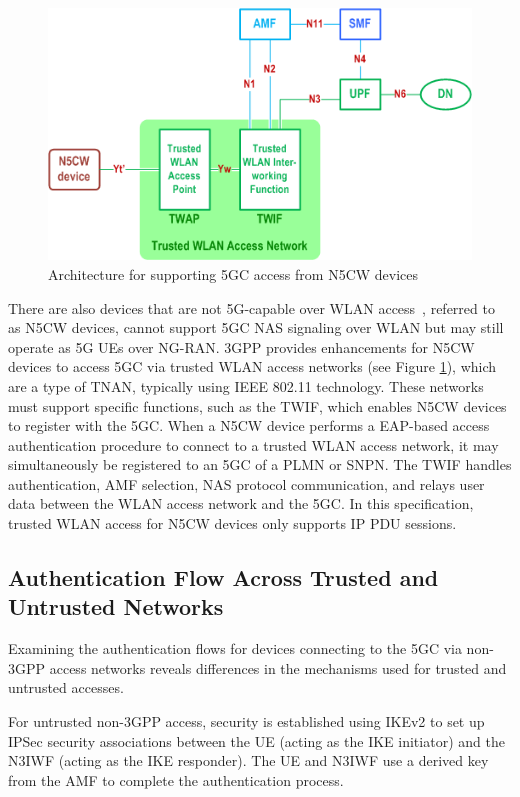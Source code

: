 \begin{figure}
    \centering
    \includegraphics[width=0.5\linewidth]{figs/Architecture for supporting 5GC access from N5CW devices.png}
    \caption{Architecture for supporting \ac{5GC} access from \ac{N5CW} devices}
    \label{fig:Architecture for supporting 5GC access from N5CW devices}
\end{figure}

There are also devices that are not \ac{5G}-capable over \ac{WLAN} access~\cite{23.501-p67}, referred to as \ac{N5CW} devices, cannot support \ac{5GC} \ac{NAS} signaling over \ac{WLAN} but may still operate as \ac{5G} \acp{UE} over \ac{NG-RAN}. \ac{3GPP} provides enhancements for N5CW devices to access \ac{5GC} via trusted \ac{WLAN} access networks (see Figure \ref{fig:Architecture for supporting 5GC access from N5CW devices}), which are a type of \ac{TNAN}, typically using IEEE 802.11 technology. These networks must support specific functions, such as the \ac{TWIF}, which enables \ac{N5CW} devices to register with the \ac{5GC}. When a \ac{N5CW} device performs a \ac{EAP}-based access authentication procedure to connect to a trusted \ac{WLAN} access network, it may simultaneously be registered to an \ac{5GC} of a \ac{PLMN} or \ac{SNPN}. The \ac{TWIF} handles authentication, \ac{AMF} selection, \ac{NAS} protocol communication, and relays user data between the \ac{WLAN} access network and the \ac{5GC}. In this specification, trusted \ac{WLAN} access for \ac{N5CW} devices only supports IP \ac{PDU} sessions.

\subsection{Authentication Flow Across Trusted and Untrusted Networks}
Examining the authentication flows for devices connecting to the \ac{5GC} via non-\ac{3GPP} access networks reveals differences in the mechanisms used for trusted and untrusted accesses.

For untrusted non-\ac{3GPP} access, security is established using \ac{IKEv2} to set up \ac{IPSec} security associations between the \ac{UE} (acting as the \ac{IKE} initiator) and the \ac{N3IWF} (acting as the \ac{IKE} responder). The \ac{UE} and \ac{N3IWF} use a derived key from the \ac{AMF} to complete the authentication process.

